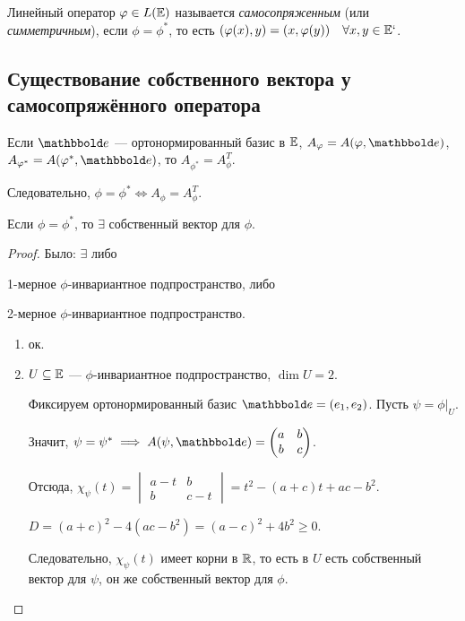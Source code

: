 \begin{definition}
    Линейный оператор $\varphi \in L(\mathbb{E})$ называется \textit{самосопряженным} (или \textit{симметричным}), если $\phi = \phi^{*}$, то есть $(\varphi(x), y) = (x, \varphi(y)) \quad \forall x, y \in \mathbb{E}`$.
\end{definition}


\subsection{Существование собственного вектора у самосопряжённого оператора}

Если $\E$ --- ортонормированный базис в $\mathbb{E}$, $A_\phi = A(\phi, \E)$, $A_{\phi^{*}} = A(\phi^{*}, \E)$, то $A_{\phi^{*}} = A_\phi^{T}$.

Следовательно, $\phi = \phi^{*} \iff A_\phi = A_\phi^{T}$.

\begin{proposal}
    Если $\phi = \phi^{*}$, то $\exists$ собственный вектор для $\phi$.
\end{proposal}

\begin{proof}
    Было: $\exists$ либо
    \begin{enumerate*}[label=\arabic*)]
    \item 1-мерное $\phi$-инвариантное подпространство, либо
    \item 2-мерное $\phi$-инвариантное подпространство.
    \end{enumerate*}

    \begin{enumerate}
    \item ок.
    \item $U \subseteq \mathbb{E}$ --- $\phi$-инвариантное подпространство, $\dim U = 2$.

        Фиксируем ортонормированный базис $\E = (e_1, e_2)$. Пусть $\psi = \phi \big|_{U}$.

        Значит, $\psi = \psi^{*} \implies A(\psi, \E) = \begin{pmatrix} a & b \\ b & c \end{pmatrix}$.

        Отсюда, $\chi_\psi(t) = \begin{vmatrix} a - t & b \\ b & c - t \end{vmatrix} = t^2 - (a + c)t + ac - b^2$.

        $D = (a + c)^2 - 4(ac - b^2) = (a - c)^2 + 4b^2 \geq 0$.

        Следовательно, $\chi_\psi(t)$ имеет корни в $\mathbb{R}$, то есть в $U$ есть собственный вектор для $\psi$, он же собственный вектор для $\phi$.
    \end{enumerate}
\end{proof}


